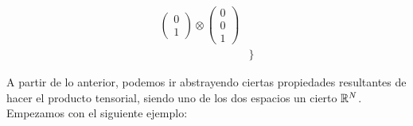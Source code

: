 \begin{ejemplo}
\begin{equation}
\begin{split}
        \begin{pmatrix}0 \\ 1 \end{pmatrix} \otimes \begin{pmatrix} 0 \\ 0 \\ 1 \end{pmatrix} \\
    & \}
    \end{split}
    \end{equation}
\end{ejemplo}

A partir de lo anterior, podemos ir abstrayendo ciertas propiedades resultantes de hacer el producto tensorial, siendo uno de los dos espacios un cierto $\mathbb{R}^N$. Empezamos con el siguiente ejemplo:

